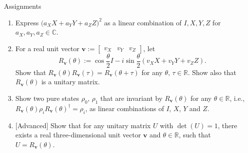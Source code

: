 \documentclass{beamer}
\begin{document}
\begin{frame}{Assignments}
\small
\begin{enumerate}
\setlength{\itemsep}{2em}
\item Express $\bigl(a_X X + a_Y Y + a_Z Z\bigr)^2$ as a linear combination of $I, X, Y, Z$ for $a_X,a_Y,a_Z\in\mathbb{C}$.
\item For a real unit vector $\mathbf{v}:=\begin{bmatrix}v_X&v_Y&v_Z\end{bmatrix}$, let
\begin{equation*}
R_\mathbf{v}(\theta) := \cos\frac{\theta}2 I - i \sin\frac{\theta}2\left(v_X X + v_Y Y + v_Z Z\right).
\end{equation*}
Show that $R_\mathbf{v}(\theta)R_\mathbf{v}(\tau)=R_\mathbf{v}(\theta+\tau)$ for any $\theta,\,\tau\in\mathbb{R}$.
Show also that $R_\mathbf{v}(\theta)$ is a unitary matrix.
\item Show two pure states $\rho_0,\,\rho_1$ that are invariant by $R_\mathbf{v}(\theta)$ for any $\theta\in\mathbb{R}$, i.e., $R_\mathbf{v}(\theta)\rho_i R_\mathbf{v}(\theta)^\dagger=\rho_i$, as linear combinations of $I$, $X$, $Y$ and $Z$.
\item {[Advanced]} Show that for any unitary matrix $U$ with $\det(U)=1$, there exists a real three-dimensional unit vector $\mathbf{v}$ and $\theta\in\mathbb{R}$, such that $U=R_\mathbf{v}(\theta)$.

\end{enumerate}
\end{frame}
\end{document}
